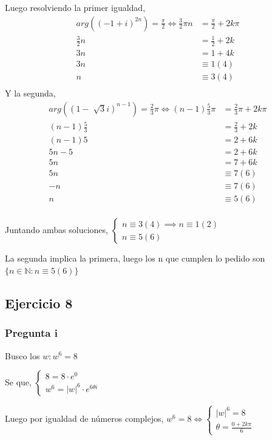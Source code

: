 Luego resolviendo la primer igualdad,
\begin{align*}
    arg((-1+i)^{2n}) = \frac{\pi}{2} \iff \frac{3}{2}\pi n &= \frac{\pi}{2} + 2k\pi \\ 
    \frac{3}{2} n &= \frac{1}{2} + 2k \\ 
    3 n &= 1 + 4k \\ 
    3 n &\equiv 1 (4) \\ 
    n &\equiv 3 (4) \\ 
\end{align*}
Y la segunda,
\begin{align*}
    arg((1-\sqrt[]{3}i)^{n-1}) = \frac{2}{3}\pi \iff (n-1)\frac{5}{3}\pi &= \frac{2}{3} \pi + 2k\pi \\  
    (n-1)\frac{5}{3} &= \frac{2}{3} + 2k \\  
    (n-1)5 &= 2 + 6k \\  
    5n-5 &= 2 + 6k \\  
    5n &= 7 + 6k \\  
    5n &\equiv 7 (6) \\  
    -n &\equiv 7 (6) \\  
    n &\equiv 5 (6) \\  
\end{align*}

Juntando ambas soluciones, $ \begin{cases}
    n \equiv 3(4) \implies n \equiv 1(2) \\
    n \equiv 5(6)
\end{cases} $

La segunda implica la primera, luego los n que cumplen lo pedido son $ \{ n \in \mathbb{N}: n\equiv 5(6) \} $

\subsection{Ejercicio 8}

\subsubsection{Pregunta i}

Busco los $ w: w^6 = 8 $

Se que, $ \begin{cases}
    8 = 8 \cdot e^0 \\
    w^6 = |w|^6 \cdot e^{6 \theta i}
\end{cases} $

Luego por igualdad de números complejos, $ w^6 = 8 \iff \begin{cases}
    |w|^6 = 8 \\
    \theta = \frac{0+2k\pi}{6}
\end{cases} $


